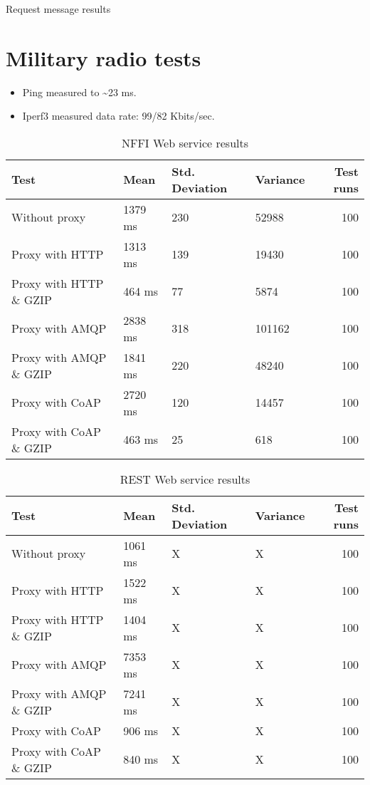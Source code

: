 \begin{appendices}
\begin{table}[H]

\caption{Request message results}
\end{table}

\section{Military radio tests}

\begin{itemize}
	\item Ping measured to \textasciitilde 23 ms.
	\item Iperf3 measured data rate: 99/82 Kbits/sec.
\end{itemize}

\begin{table}[H]
\begin{tabular}{llllr}
\hline
 Test                   &   Mean &   Std. Deviation &   Variance &   Test runs \\
\hline
  Without proxy & 1379 ms & 230 & 52988 & 100 \\
  Proxy with HTTP & 1313 ms & 139 & 19430 & 100 \\
  Proxy with HTTP \& GZIP & 464 ms & 77 & 5874 & 100 \\
  Proxy with AMQP & 2838 ms & 318 & 101162 & 100 \\
  Proxy with AMQP \& GZIP & 1841 ms & 220 & 48240 & 100\\
  Proxy with CoAP & 2720 ms & 120 & 14457 & 100 \\
  Proxy with CoAP \& GZIP & 463 ms & 25 & 618 & 100 \\
\end{tabular}
\caption{NFFI Web service results}
\end{table}


\begin{table}[H]
\begin{tabular}{llllr}
\hline
 Test                   &   Mean &   Std. Deviation &   Variance &   Test runs \\
\hline
  Without proxy & 1061 ms & X & X & 100 \\
  Proxy with HTTP & 1522 ms & X & X & 100 \\
  Proxy with HTTP \& GZIP & 1404 ms & X & X & 100 \\
  Proxy with AMQP & 7353 ms & X & X & 100 \\
  Proxy with AMQP \& GZIP & 7241 ms & X & X & 100\\
  Proxy with CoAP & 906 ms & X & X & 100 \\
  Proxy with CoAP \& GZIP & 840 ms & X & X & 100 \\
\end{tabular}
\caption{REST Web service results}
\end{table}



\end{appendices}
